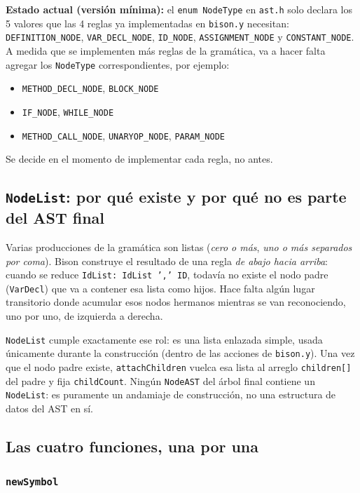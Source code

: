 \documentclass[11pt,a4paper]{article}
\begin{document}
\textbf{Estado actual (versi\'on m\'inima):} el \texttt{enum NodeType}
en \texttt{ast.h} solo declara los 5 valores que las 4 reglas ya
implementadas en \texttt{bison.y} necesitan:
\texttt{DEFINITION\_NODE}, \texttt{VAR\_DECL\_NODE}, \texttt{ID\_NODE},
\texttt{ASSIGNMENT\_NODE} y \texttt{CONSTANT\_NODE}. A medida que se
implementen m\'as reglas de la gram\'atica, va a hacer falta agregar
los \texttt{NodeType} correspondientes, por ejemplo:
\begin{itemize}[nosep]
    \item \texttt{METHOD\_DECL\_NODE}, \texttt{BLOCK\_NODE}
    \item \texttt{IF\_NODE}, \texttt{WHILE\_NODE}
    \item \texttt{METHOD\_CALL\_NODE}, \texttt{UNARYOP\_NODE}, \texttt{PARAM\_NODE}
\end{itemize}
Se decide en el momento de implementar cada regla, no antes.

\subsection{\texttt{NodeList}: por qu\'e existe y por qu\'e no es parte del AST final}

Varias producciones de la gram\'atica son listas (\emph{cero o m\'as},
\emph{uno o m\'as separados por coma}). Bison construye el resultado de
una regla \emph{de abajo hacia arriba}: cuando se reduce
\texttt{IdList: IdList ',' ID}, todav\'ia no existe el nodo padre
(\texttt{VarDecl}) que va a contener esa lista como hijos. Hace falta
alg\'un lugar transitorio donde acumular esos nodos hermanos mientras se
van reconociendo, uno por uno, de izquierda a derecha.

\texttt{NodeList} cumple exactamente ese rol: es una lista enlazada
simple, usada \'unicamente durante la construcci\'on (dentro de las
acciones de \texttt{bison.y}). Una vez que el nodo padre existe,
\texttt{attachChildren} vuelca esa lista al arreglo \texttt{children[]}
del padre y fija \texttt{childCount}. Ning\'un \texttt{NodeAST} del
\'arbol final contiene un \texttt{NodeList}: es puramente un andamiaje de
construcci\'on, no una estructura de datos del AST en s\'i.

\subsection{Las cuatro funciones, una por una}

\subsubsection{\texttt{newSymbol}}
\end{document}
